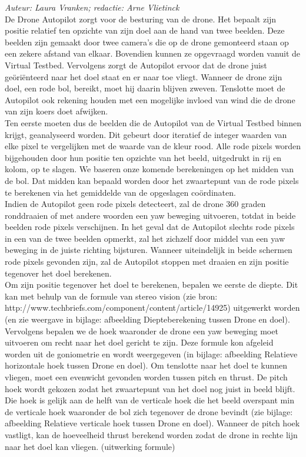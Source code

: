 {\em Auteur: Laura Vranken; redactie: Arne Vlietinck}\\

De Drone Autopilot zorgt voor de besturing van de drone. Het bepaalt zijn positie relatief ten opzichte van zijn doel aan de hand van twee beelden. Deze beelden zijn gemaakt door twee camera's die op de drone gemonteerd staan op een zekere afstand van elkaar. Bovendien kunnen ze opgevraagd worden vanuit de Virtual Testbed. Vervolgens zorgt de Autopilot ervoor dat de drone juist ge\"ori\"enteerd naar het doel staat en er naar toe vliegt. Wanneer de drone zijn doel,  een rode bol, bereikt, moet hij daarin blijven zweven. Tenslotte moet de Autopilot ook rekening houden met een mogelijke invloed van wind die de drone van zijn koers doet afwijken.\\

Ten eerste moeten dus de beelden die de Autopilot van de Virtual Testbed binnen krijgt, geanalyseerd worden. Dit gebeurt door iteratief de integer waarden van elke pixel te vergelijken met de waarde van de kleur rood. Alle rode pixels worden bijgehouden door hun positie ten opzichte van het beeld, uitgedrukt in rij en kolom, op te slagen. We baseren onze komende berekeningen op het midden van de bol. Dat midden kan bepaald worden door het zwaartepunt van de rode pixels te berekenen via het gemiddelde van de opgeslagen co\"ordinaten.\\

Indien de Autopilot geen rode pixels detecteert, zal de drone 360 graden ronddraaien of met andere woorden een yaw beweging uitvoeren, totdat in beide beelden rode pixels verschijnen. In het geval dat de Autopilot slechts rode pixels in een van de twee beelden opmerkt, zal het zichzelf door middel van een yaw beweging in de juiste richting bijsturen. Wanneer uiteindelijk in beide schermen rode pixels gevonden zijn, zal de Autopilot stoppen met draaien en zijn positie tegenover het doel berekenen.\\

Om zijn positie tegenover het doel te berekenen, bepalen we eerste de diepte. Dit kan met behulp van de formule van stereo vision (zie bron: http://www.techbriefs.com/component/content/article/14925) uitgewerkt worden (en zie weergave in bijlage: afbeelding Diepteberekening tussen Drone en doel). Vervolgens bepalen we de hoek waaronder de drone een yaw beweging moet uitvoeren om recht naar het doel gericht te zijn. Deze formule kon afgeleid worden uit de goniometrie en wordt weergegeven (in bijlage: afbeelding Relatieve horizontale hoek tussen Drone en doel). Om tenslotte naar het doel te kunnen vliegen, moet een evenwicht gevonden worden tussen pitch en thrust. De pitch hoek wordt gekozen zodat het zwaartepunt van het doel nog juist in beeld blijft. Die hoek is gelijk aan de helft van de verticale hoek die het beeld overspant min de verticale hoek waaronder de bol zich tegenover de drone bevindt (zie bijlage: afbeelding Relatieve verticale hoek tussen Drone en doel). Wanneer de pitch hoek vastligt, kan de hoeveelheid thrust berekend worden zodat de drone in rechte lijn naar het doel kan vliegen. (uitwerking formule)\\

